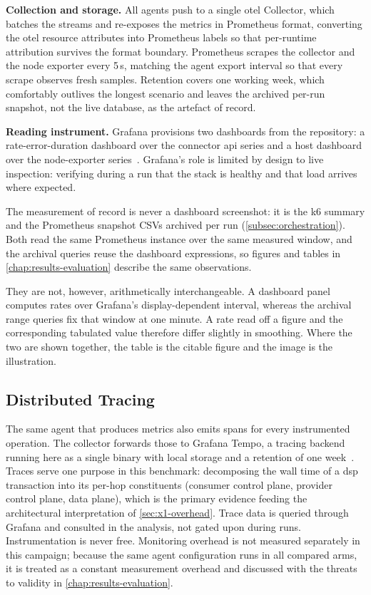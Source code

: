 \textbf{Collection and storage.} All agents push to a single \gls{otel} Collector, which batches the streams and re-exposes the metrics in Prometheus format, converting the \gls{otel} resource attributes into Prometheus labels so that per-runtime attribution survives the format boundary. Prometheus scrapes the collector and the node exporter every 5\,s, matching the agent export interval so that every scrape observes fresh samples. Retention covers one working week, which comfortably outlives the longest scenario and leaves the archived per-run snapshot, not the live database, as the artefact of record.

\pagebreak

\textbf{Reading instrument.} Grafana provisions two dashboards from the repository: a rate-error-duration dashboard over the connector \gls{api} series and a host dashboard over the node-exporter series~\citep{grafanaDocs}. Grafana's role is limited by design to live inspection: verifying during a run that the stack is healthy and that load arrives where expected.

The measurement of record is never a dashboard screenshot: it is the k6 summary and the Prometheus snapshot CSVs archived per run (\cref{subsec:orchestration}). Both read the same Prometheus instance over the same measured window, and the archival queries reuse the dashboard expressions, so figures and tables in \cref{chap:results-evaluation} describe the same observations.

They are not, however, arithmetically interchangeable. A dashboard panel computes rates over Grafana's display-dependent interval, whereas the archival range queries fix that window at one minute. A rate read off a figure and the corresponding tabulated value therefore differ slightly in smoothing. Where the two are shown together, the table is the citable figure and the image is the illustration.

\subsection{Distributed Tracing}\label{subsec:tracing}

The same agent that produces metrics also emits spans for every instrumented operation. The collector forwards those to Grafana Tempo, a tracing backend running here as a single binary with local storage and a retention of one week~\citep{grafanaTempoDocs}. Traces serve one purpose in this benchmark: decomposing the wall time of a \gls{dsp} transaction into its per-hop constituents (consumer control plane, provider control plane, data plane), which is the primary evidence feeding the architectural interpretation of \cref{sec:x1-overhead}. Trace data is queried through Grafana and consulted in the analysis, not gated upon during runs. Instrumentation is never free. Monitoring overhead is not measured separately in this campaign; because the same agent configuration runs in all compared arms, it is treated as a constant measurement overhead and discussed with the threats to validity in \cref{chap:results-evaluation}.

